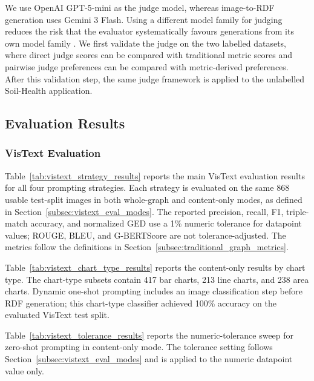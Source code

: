 \documentclass[preprint,12pt]{elsarticle}
\begin{document}
We use OpenAI GPT-5-mini \citep{openai2025gpt5systemcard} as the judge model,
whereas image-to-RDF generation uses Gemini 3 Flash. Using a different model
family for judging reduces the risk that the evaluator systematically favours
generations from its own model family \citep{spiliopoulou2025playfavorites}. We first validate the judge on the two labelled datasets, where direct judge scores can be compared with traditional metric scores and pairwise judge preferences can be compared with metric-derived preferences. After this validation step, the same judge framework is applied to the unlabelled Soil-Health application.

\subsection{Evaluation Results}\label{sec:results}

\subsubsection{VisText Evaluation}

Table~\ref{tab:vistext_strategy_results} reports the main VisText evaluation results for all four prompting strategies. Each strategy is evaluated on the same 868 usable test-split images in both whole-graph and content-only modes, as defined in Section~\ref{subsec:vistext_eval_modes}. The reported precision, recall, F1, triple-match accuracy, and normalized GED use a 1\% numeric tolerance for datapoint values; ROUGE, BLEU, and G-BERTScore are not tolerance-adjusted. The metrics follow the definitions in Section~\ref{subsec:traditional_graph_metrics}.

Table~\ref{tab:vistext_chart_type_results} reports the content-only results by chart type. The chart-type subsets contain 417 bar charts, 213 line charts, and 238 area charts. Dynamic one-shot prompting includes an image classification step before RDF generation; this chart-type classifier achieved 100\% accuracy on the evaluated VisText test split.

Table~\ref{tab:vistext_tolerance_results} reports the numeric-tolerance sweep for zero-shot prompting in content-only mode. The tolerance setting follows Section~\ref{subsec:vistext_eval_modes} and is applied to the numeric datapoint value only.
\end{document}
